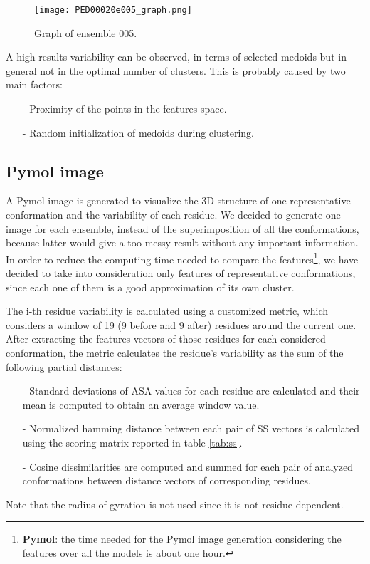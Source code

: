 \begin{figure}[H]
    \centering
		\texttt{[image: PED00020e005\_graph.png]}
		\caption{Graph of ensemble 005.}
		\label{model005}
\end{figure}

A high results variability can be observed, in terms of selected medoids but in general not in the optimal number of clusters.
This is probably caused by two main factors:
\begin{itemize}
    \item[-] Proximity of the points in the features space.
    \item[-] Random initialization of medoids during clustering.
\end{itemize}

\subsection{Pymol image}
A Pymol image is generated to visualize the 3D structure of one representative conformation and the variability of each residue.
We decided to generate one image for each ensemble, instead of the superimposition of all the conformations, because latter would give a too messy result without any important information.
In order to reduce the computing time needed to compare the features\footnote{\textbf{Pymol}: the time needed for the Pymol image generation considering the features over all the models is about one hour.}, we have decided to take into consideration only features of representative conformations, since each one of them is a good approximation of its own cluster.

\medskip
The i-th residue variability is calculated using a customized metric, which considers a window of 19 (9 before and 9 after) residues around the current one. After extracting the features vectors of those residues for each considered conformation, the metric calculates the residue's variability as the sum of the following partial distances:
\begin{itemize}
\item[-] Standard deviations of ASA values for each residue are calculated and their mean is computed to obtain an average window value.
\item[-] Normalized hamming distance between each pair of SS vectors is calculated using the scoring matrix reported in table \ref{tab:ss}.
\item[-] Cosine dissimilarities are computed and summed for each pair of analyzed conformations between distance vectors of corresponding residues.
\end{itemize}
Note that the radius of gyration is not used since it is not residue-dependent.

